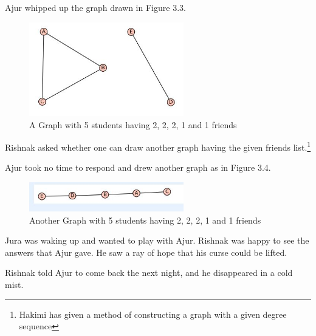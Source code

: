 Ajur whipped up the graph drawn in Figure 3.3. 

\begin{figure}
\includegraphics[width=0.6\textwidth]{graphstory1-2.JPG}
\caption{A Graph with 5 students having 2, 2, 2, 1 and 1 friends}
\end{figure}

Rishnak asked whether one can draw another graph having the given friends list.\footnote{Hakimi has given a method of constructing a graph with a given degree sequence}

Ajur took no time to respond and drew another graph as in Figure 3.4.

\begin{figure}
\includegraphics[width=0.6\textwidth]{graphstory1-3.JPG}
\caption{Another Graph with 5 students having 2, 2, 2, 1 and 1 friends}
\end{figure}

Jura was waking up and wanted to play with Ajur. Rishnak was happy to see the answers that Ajur gave. He saw a ray of hope that his curse could be lifted. 

Rishnak told Ajur to come back the next night, and he disappeared in a cold mist.